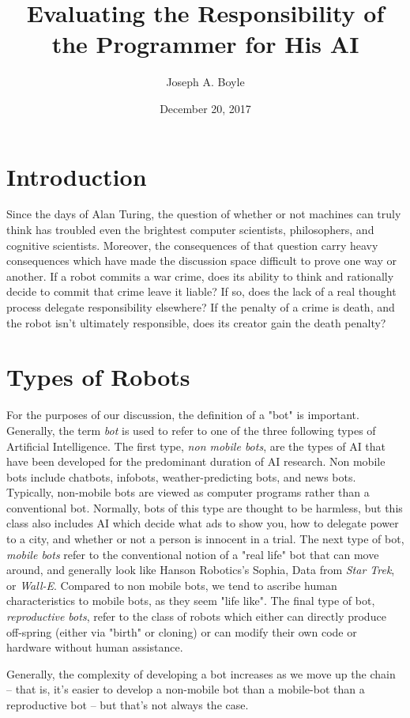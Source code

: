 \documentclass[12]{article}
\title{Evaluating the Responsibility of the Programmer for His AI}
\author{Joseph A. Boyle}
\date{December 20, 2017}
\begin{document}
\maketitle

\section{Introduction}
Since the days of Alan Turing\cite{turing_test}, the question of whether or not machines can truly think has troubled even the brightest computer scientists, philosophers, and cognitive scientists. Moreover, the consequences of that question carry heavy consequences which have made the discussion space difficult to prove one way or another. If a robot commits a war crime, does its ability to think and rationally decide to commit that crime leave it liable? If so, does the lack of a real thought process delegate responsibility elsewhere? If the penalty of a crime is death, and the robot isn't ultimately responsible, does its creator gain the death penalty?

\section{Types of Robots}
	For the purposes of our discussion, the definition of a "bot" is important. Generally, the term \textit{bot} is used to refer to one of the three following types of Artificial Intelligence. The first type, \textit{non mobile bots}, are the types of AI that have been developed for the predominant duration of AI research. Non mobile bots include chatbots, infobots, weather-predicting bots, and news bots. Typically, non-mobile bots are viewed as computer programs rather than a conventional bot. Normally, bots of this type are thought to be harmless, but this class also includes AI which decide what ads to show you, how to delegate power to a city, and whether or not a person is innocent in a trial. The next type of bot,  \textit{mobile bots} refer to the conventional notion of a "real life" bot that can move around, and generally look like Hanson Robotics's Sophia, Data from \textit{Star Trek}, or \textit{Wall-E}. Compared to non mobile bots, we tend to ascribe human characteristics to mobile bots, as they seem "life like". The final type of bot, \textit{reproductive bots}, refer to the class of robots which either can directly produce off-spring (either via "birth" or cloning) or can modify their own code or hardware without human assistance. 
	
	Generally, the complexity of developing a bot increases as we move up the chain -- that is, it's easier to develop a non-mobile bot than a mobile-bot than a reproductive bot -- but that's not always the case.	
	
\end{document}
